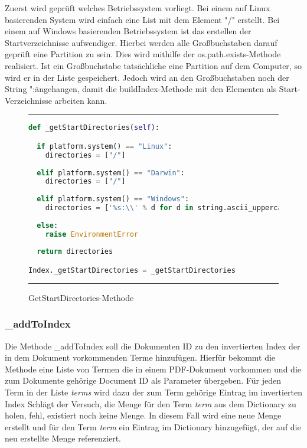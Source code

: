 Zuerst wird geprüft welches Betriebssystem vorliegt. Bei einem auf Linux basierenden System wird einfach eine List mit dem Element "/" erstellt. Bei einem auf Windows basierenden Betriebssystem ist das erstellen der Startverzeichnisse aufwendiger. Hierbei werden alle Großbuchstaben darauf geprüft eine Partition zu sein. Dies wird mithilfe der os.path.exists-Methode realisiert. Ist ein Großbuchstabe tatsächliche eine Partition auf dem Computer, so wird er in der Liste gespeichert. Jedoch wird an den Großbuchstaben noch der String ":\" angehangen, damit die buildIndex-Methode mit den Elementen als Start-Verzeichnisse arbeiten kann.

\begin{figure}[h]
	\rule{\textwidth}{0.4pt}
		\begin{lstlisting}[language=Python]
def _getStartDirectories(self):

  if platform.system() == "Linux":
    directories = ["/"]
    
  elif platform.system() == "Darwin":
    directories = ["/"]
     
  elif platform.system() == "Windows":
    directories = ['%s:\\' % d for d in string.ascii_uppercase if os.path.exists('%s:' % d)]
        
  else:
    raise EnvironmentError
        
  return directories

Index._getStartDirectories = _getStartDirectories
		\end{lstlisting}
	\rule{\textwidth}{0.4pt}
	\caption{GetStartDirectories-Methode}
	\label{fig:start}
\end{figure}

\subsubsection{\_addToIndex}\label{addtoindex}

Die Methode \_addToIndex soll die Dokumenten ID zu den invertierten Index der in dem Dokument vorkommenden Terme hinzufügen. Hierfür bekommt die Methode eine Liste von Termen die in einem PDF-Dokument vorkommen und die zum Dokumente gehörige Document ID als Parameter übergeben. Für jeden Term in der Liste \emph{terms} wird dazu der zum Term gehörige Eintrag im invertierten Index 
Schlägt der Versuch, die Menge für den Term \emph{term} aus dem Dictionary zu holen, fehl, existiert noch keine Menge. In diesem Fall wird eine neue Menge erstellt und für den Term \emph{term} ein Eintrag im Dictionary hinzugefügt, der auf die neu erstellte Menge referenziert.


